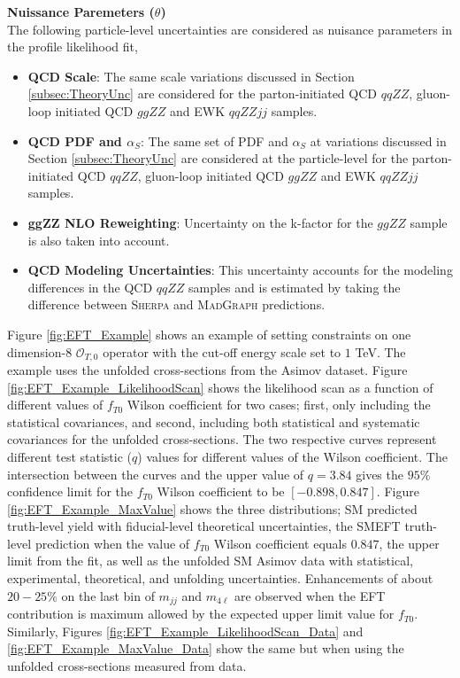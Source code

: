 \textbf{Nuissance Paremeters ($\theta$)} \\
The following particle-level uncertainties are considered as nuisance parameters in the profile likelihood fit,
\begin{itemize}
    \item{\textbf{QCD Scale}: The same scale variations discussed in Section \ref{subsec:TheoryUnc} are considered for the parton-initiated QCD $qqZZ$, gluon-loop initiated QCD $ggZZ$ and EWK $qqZZjj$ samples.} 
    \item{\textbf{QCD PDF and $\alpha_{S}$}: The same set of PDF and $\alpha_{S}$ at variations discussed in Section \ref{subsec:TheoryUnc} are considered at the particle-level for the parton-initiated QCD $qqZZ$, gluon-loop initiated QCD $ggZZ$ and EWK $qqZZjj$ samples. }
    \item{\textbf{ggZZ NLO Reweighting}: Uncertainty on the k-factor for the $ggZZ$ sample is also taken into account. }
    \item{\textbf{QCD Modeling Uncertainties}: This uncertainty accounts for the modeling differences in the QCD $qqZZ$ samples and is estimated by taking the difference between \textsc{Sherpa} and \textsc{MadGraph} predictions.} 
\end{itemize}

Figure \ref{fig:EFT_Example} shows an example of setting constraints on one dimension-8 $\mathcal{O}_{T,0}$ operator with the cut-off energy scale set to $1$ TeV. The example uses the unfolded cross-sections from the Asimov dataset. Figure \ref{fig:EFT_Example_LikelihoodScan} shows the likelihood scan as a function of different values of $f_{T0}$ Wilson coefficient for two cases; first, only including the statistical covariances, and second, including both statistical and systematic covariances for the unfolded cross-sections. The two respective curves represent different test statistic ($q$) values for different values of the Wilson coefficient. The intersection between the curves and the upper value of $q=3.84$ gives the $95\%$ confidence limit for the $f_{T0}$ Wilson coefficient to be $[-0.898,0.847]$. Figure \ref{fig:EFT_Example_MaxValue} shows the three distributions; SM predicted truth-level yield with fiducial-level theoretical uncertainties, the SMEFT truth-level prediction when the value of $f_{T0}$ Wilson coefficient equals $0.847$, the upper limit from the fit, as well as the unfolded SM Asimov data with statistical, experimental, theoretical, and unfolding uncertainties. Enhancements of about $20-25\%$ on the last bin of $m_{jj}$ and $m_{4\ell}$ are observed when the EFT contribution is maximum allowed by the expected upper limit value for $f_{T0}$. Similarly, Figures \ref{fig:EFT_Example_LikelihoodScan_Data} and \ref{fig:EFT_Example_MaxValue_Data} show the same but when using the unfolded cross-sections measured from data. 

